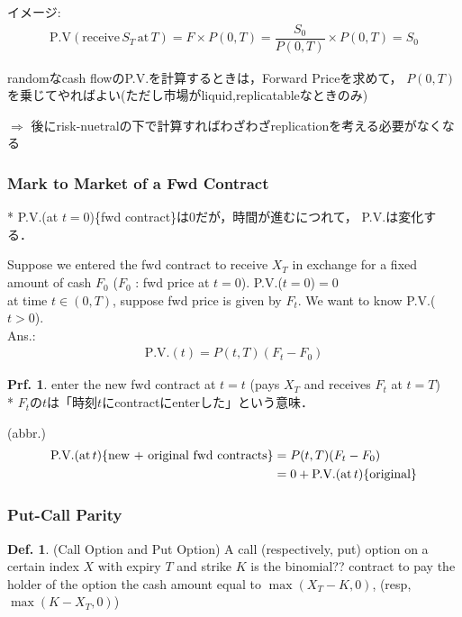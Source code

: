 \documentclass[a4paper,11pt]{jsarticle}
\theoremstyle{definition}
\newtheorem{definition}{Def.}[subsection]
\newtheorem{prf}{Prf.}[subsection]
\newcommand{\df}[2]{\dfrac{#1}{#2}}
\begin{document}
イメージ:
\begin{align}
  \mbox{P.V}(\mbox{receive} \, S_T \,\mbox{at} \, T)
  =F\times P(0,T)=\df{S_0}{P(0,T)}\times P(0,T)=S_0
\end{align}

randomなcash flowのP.V.を計算するときは，Forward Priceを求めて，
$P(0,T)$を乗じてやればよい(ただし市場がliquid,replicatableなときのみ)

$\Rightarrow$ 後にrisk-nuetralの下で計算すればわざわざreplicationを考える必要がなくなる


\subsubsection{Mark to Market of a Fwd Contract}
* P.V.(at $t=0$)\{fwd contract\}は0だが，時間が進むにつれて，
P.V.は変化する．

Suppose we entered the fwd contract to receive $X_T$
in exchange for a fixed amount of cash $F_0$
($F_0$ : fwd price at $t=0$). P.V.($t=0$)$=0$ \\
at time $t\in(0,T)$, suppose fwd price is given by $F_t$.
We want to know P.V.($t>0$).\\
Ans.:
\begin{align}
  \mbox{P.V.}(t)=P(t,T)(F_t-F_0)
\end{align}
\begin{prf}
  enter the new fwd contract at $t=t$
  (pays $X_T$ and receives $F_t$ at $t=T$) \\
  * $F_t$の$t$は「時刻$t$にcontractにenterした」という意味．

  (abbr.)
  \begin{align}
    \mbox{P.V.}(\mbox{at}\, t)
    \{\mbox{new + original fwd contracts}\}
    &=P(t,T)(F_t-F_0) \notag \\
    &=0+\mbox{P.V.}(\mbox{at}\, t)\{\mbox{original}\}
  \end{align}
\end{prf}

\subsubsection{Put-Call Parity}
\begin{definition}{(Call Option and Put Option)}
  A call (respectively, put) option on a certain index $X$
  with expiry $T$ and strike $K$ is the binomial?? contract
  to pay the holder of the option the cash amount equal to
  $\max(X_T-K,0)$, (resp, $\max(K-X_T,0)$)
\end{definition}
\end{document}
